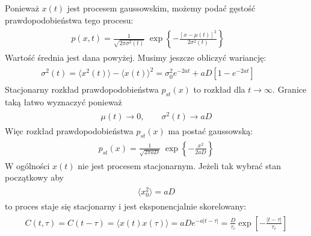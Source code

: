 \documentclass[a4paper,12pt,polish]{sphinxmanual}
\begin{document}
Ponieważ $x(t)$ jest procesem gaussowskim, możemy podać gęstość prawdopodobieństwa tego procesu:
\label{ch3/chIII032:equation-eqn10}\begin{gather}
\begin{split}p(x, t) = \frac{1}{\sqrt{2\pi \sigma^2(t)} }\; \exp\left\{ - \frac{[x-\mu(t)]^2}{2\sigma^2(t)}\right\} \qquad\end{split}\label{ch3/chIII032-eqn10}
\end{gather}
Wartość średnia jest dana powyżej. Musimy jeszcze obliczyć wariancję:
\label{ch3/chIII032:equation-eqn11}\begin{gather}
\begin{split}\sigma^2(t) = \langle x^2(t) \rangle - \langle x(t)\rangle^2 = \sigma^2_0 e^{-2at} + aD [1 - e^{-2at}] \qquad\end{split}\label{ch3/chIII032-eqn11}
\end{gather}
Stacjonarny rozkład prawdopodobieństwa $p_{st}(x)$ to rozkład dla $t\to\infty$. Granice taką łatwo wyznaczyć ponieważ
\label{ch3/chIII032:equation-eqn12}\begin{gather}
\begin{split}\mu(t) \to 0, \qquad \sigma^2(t) \to aD\end{split}\label{ch3/chIII032-eqn12}
\end{gather}
Więc rozkład prawdopodobieństwa $p_{st}(x)$ ma postać gaussowską:
\label{ch3/chIII032:equation-eqn13}\begin{gather}
\begin{split}p_{st}(x) = \frac{1}{\sqrt{2\pi aD} }\; \exp\left\{ - \frac{x^2}{2 aD}\right\}\end{split}\label{ch3/chIII032-eqn13}
\end{gather}
W ogólności $x(t)$ nie jest procesem stacjonarnym. Jeżeli tak wybrać stan początkowy aby
\label{ch3/chIII032:equation-eqn14}\begin{gather}
\begin{split}\langle x_0^2 \rangle = aD\end{split}\label{ch3/chIII032-eqn14}
\end{gather}
to proces staje się stacjonarny i jest eksponencjalnie skorelowany:
\label{ch3/chIII032:equation-eqn15}\begin{gather}
\begin{split}C(t, \tau) = C(t-\tau) = \langle x(t) x(\tau) \rangle = aD e^{-a|t-\tau|} = \frac{D}{\tau_c} \exp\left[ -\frac{|t-\tau|}{\tau_c}\right]\end{split}\label{ch3/chIII032-eqn15}
\end{gather}
\end{document}
